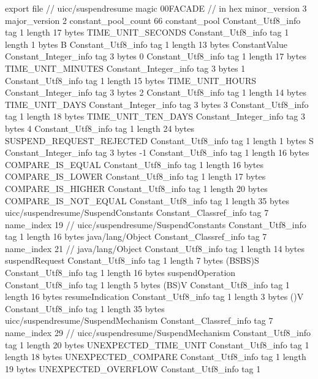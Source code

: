 export file {		// uicc/suspendresume
	magic	00FACADE		 // in hex
	minor_version	3
	major_version	2
	constant_pool_count	66
	constant_pool {
		Constant_Utf8_info {
			tag	1
			length	17
			bytes	TIME_UNIT_SECONDS
		}
		Constant_Utf8_info {
			tag	1
			length	1
			bytes	B
		}
		Constant_Utf8_info {
			tag	1
			length	13
			bytes	ConstantValue
		}
		Constant_Integer_info {
			tag	3
			bytes	0
		}
		Constant_Utf8_info {
			tag	1
			length	17
			bytes	TIME_UNIT_MINUTES
		}
		Constant_Integer_info {
			tag	3
			bytes	1
		}
		Constant_Utf8_info {
			tag	1
			length	15
			bytes	TIME_UNIT_HOURS
		}
		Constant_Integer_info {
			tag	3
			bytes	2
		}
		Constant_Utf8_info {
			tag	1
			length	14
			bytes	TIME_UNIT_DAYS
		}
		Constant_Integer_info {
			tag	3
			bytes	3
		}
		Constant_Utf8_info {
			tag	1
			length	18
			bytes	TIME_UNIT_TEN_DAYS
		}
		Constant_Integer_info {
			tag	3
			bytes	4
		}
		Constant_Utf8_info {
			tag	1
			length	24
			bytes	SUSPEND_REQUEST_REJECTED
		}
		Constant_Utf8_info {
			tag	1
			length	1
			bytes	S
		}
		Constant_Integer_info {
			tag	3
			bytes	-1
		}
		Constant_Utf8_info {
			tag	1
			length	16
			bytes	COMPARE_IS_EQUAL
		}
		Constant_Utf8_info {
			tag	1
			length	16
			bytes	COMPARE_IS_LOWER
		}
		Constant_Utf8_info {
			tag	1
			length	17
			bytes	COMPARE_IS_HIGHER
		}
		Constant_Utf8_info {
			tag	1
			length	20
			bytes	COMPARE_IS_NOT_EQUAL
		}
		Constant_Utf8_info {
			tag	1
			length	35
			bytes	uicc/suspendresume/SuspendConstants
		}
		Constant_Classref_info {
			tag	7
			name_index	19		// uicc/suspendresume/SuspendConstants
		}
		Constant_Utf8_info {
			tag	1
			length	16
			bytes	java/lang/Object
		}
		Constant_Classref_info {
			tag	7
			name_index	21		// java/lang/Object
		}
		Constant_Utf8_info {
			tag	1
			length	14
			bytes	suspendRequest
		}
		Constant_Utf8_info {
			tag	1
			length	7
			bytes	(BSBS)S
		}
		Constant_Utf8_info {
			tag	1
			length	16
			bytes	suspendOperation
		}
		Constant_Utf8_info {
			tag	1
			length	5
			bytes	(BS)V
		}
		Constant_Utf8_info {
			tag	1
			length	16
			bytes	resumeIndication
		}
		Constant_Utf8_info {
			tag	1
			length	3
			bytes	()V
		}
		Constant_Utf8_info {
			tag	1
			length	35
			bytes	uicc/suspendresume/SuspendMechanism
		}
		Constant_Classref_info {
			tag	7
			name_index	29		// uicc/suspendresume/SuspendMechanism
		}
		Constant_Utf8_info {
			tag	1
			length	20
			bytes	UNEXPECTED_TIME_UNIT
		}
		Constant_Utf8_info {
			tag	1
			length	18
			bytes	UNEXPECTED_COMPARE
		}
		Constant_Utf8_info {
			tag	1
			length	19
			bytes	UNEXPECTED_OVERFLOW
		}
		Constant_Utf8_info {
			tag	1
}}}
